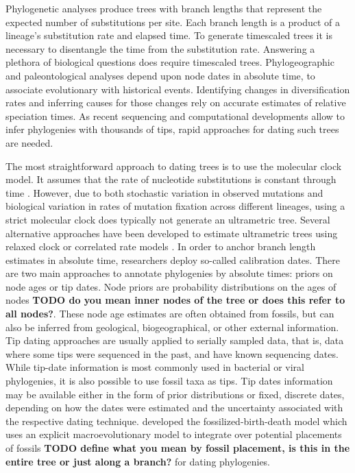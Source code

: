 \documentclass{llncs}
\begin{document}
\vspace{1.5in}

Phylogenetic analyses produce trees with branch lengths that represent the expected number of substitutions per site.
Each branch length is a product of a lineage's substitution rate and elapsed time.
To generate time\textendash scaled trees it is necessary to disentangle the time from the substitution rate.
Answering  a plethora of biological questions does require time\textendash scaled trees.
Phylogeographic and paleontological analyses depend upon node dates in absolute time,
to associate evolutionary with historical events.
Identifying changes in diversification rates and inferring causes for those changes
rely on accurate estimates of relative speciation times.
As recent sequencing and computational developments allow to infer
phylogenies with thousands of tips, rapid approaches for dating such trees are needed.

The most straightforward approach to dating trees is to use the molecular clock model.
It assumes that the rate of nucleotide substitutions is constant through time \citep{zuckerkandl1962}.
However, due to both stochastic variation in observed mutations and 
biological variation in rates of mutation fixation across different lineages,
using a strict molecular clock does typically not generate an ultrametric tree.
Several alternative approaches have been developed to estimate
ultrametric trees using relaxed clock or correlated rate models \citep{Lepage2007, Thorne1998, Kishino2001}.
In order to anchor branch length estimates in absolute time, researchers deploy so-called calibration dates. 
There are two main approaches to annotate phylogenies by absolute times:
priors on node ages or tip dates.
Node priors are probability distributions on the ages of nodes {\bf TODO do you mean inner nodes of the tree or does this refer to all nodes?}.
These node age estimates are often obtained from fossils,
but can also be inferred from geological, biogeographical, or other external information.
Tip dating approaches are usually applied to serially sampled data, that is, 
data where some tips were sequenced in the past, and have known sequencing dates.
While tip-date information is most commonly used in bacterial or viral phylogenies,
it is also possible to use fossil taxa as tips.
Tip dates information may be available either in the form of prior distributions or fixed, discrete dates, 
depending on how the dates were estimated and the uncertainty associated with the respective
dating technique.
\citet{Heath2014} developed the fossilized-birth-death model which 
uses an explicit macroevolutionary model to integrate over potential 
placements of fossils {\bf TODO define what you mean by fossil placement, is this in the entire tree or just along a branch?} for dating phylogenies.
\end{document}
